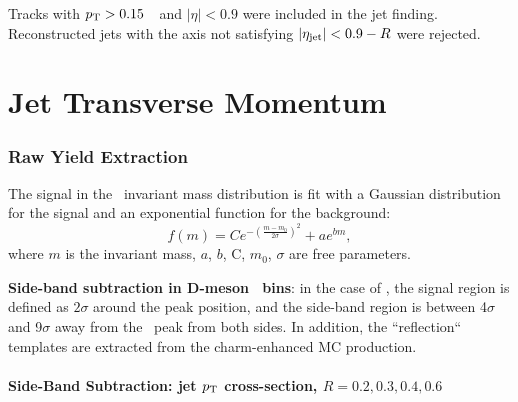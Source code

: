 Tracks with $p_{\rm T}>0.15$~\GeVc\ and $|\eta|<0.9$ were included in the jet finding. 
Reconstructed jets with the axis not satisfying $|\eta_{\mathrm{jet}}|<0.9-R$ were rejected.

\part{Jet Transverse Momentum}

\section{Raw Yield Extraction}
\label{sect:raw_yield}
The signal in the \Dzero\ invariant mass distribution is fit with a Gaussian distribution for the signal and an exponential function for the background:
\begin{equation}
\label{e_sigbkgDZero}
f (m) = Ce^{-(\frac{m-m_0}{2\sigma})^2} + ae^{bm},
\end{equation}
where $m$ is the invariant mass, $a$, $b$, C, $m_0$, $\sigma$ are free parameters.

{\bf Side-band subtraction in D-meson \pt\ bins}: in the case of \Dzero, the signal region is defined as $2\sigma$ around the peak position, and the side-band region is between 4$\sigma$ and 9$\sigma$ away from the \Dzero\ peak from both sides.
In addition, the ``reflection`` templates are extracted from the charm-enhanced MC production.

\subsection{Side-Band Subtraction: jet $p_{\text T}$ cross-section, $R=0.2, 0.3, 0.4, 0.6$}
\label{sub_Bin_d_pT}

